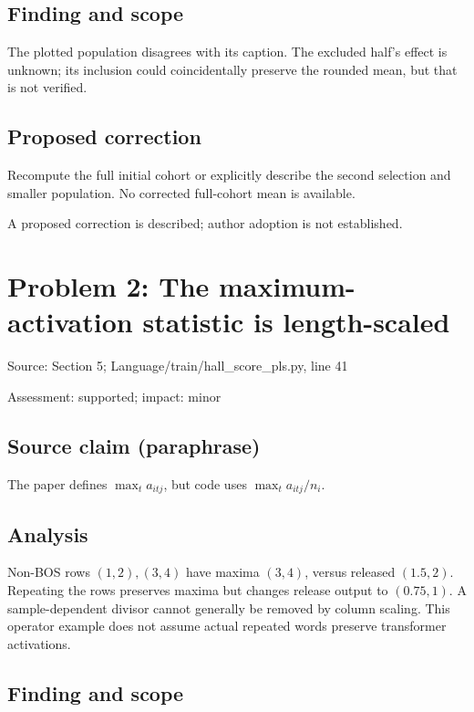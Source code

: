 \documentclass[11pt]{article}
\begin{document}
\subsection*{Finding and scope}

The plotted population disagrees with its caption. The excluded half’s effect is unknown; its inclusion could coincidentally preserve the rounded mean, but that is not verified.

\subsection*{Proposed correction}

Recompute the full initial cohort or explicitly describe the second selection and smaller population. No corrected full-cohort mean is available.

A proposed correction is described; author adoption is not established.

\section*{Problem 2: The maximum-activation statistic is length-scaled}

Source: Section 5; Language/train/hall\_score\_pls.py, line 41

Assessment: supported; impact: minor

\subsection*{Source claim (paraphrase)}

The paper defines \(\max_ta_{itj}\), but code uses \(\max_ta_{itj}/n_i\).

\subsection*{Analysis}

Non-BOS rows \((1,2),(3,4)\) have maxima \((3,4)\), versus released \((1.5,2)\). Repeating the rows preserves maxima but changes release output to \((0.75,1)\). A sample-dependent divisor cannot generally be removed by column scaling. This operator example does not assume actual repeated words preserve transformer activations.

\subsection*{Finding and scope}
\end{document}
